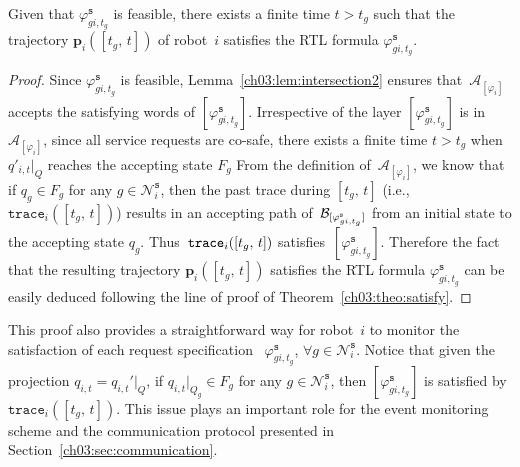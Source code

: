 \begin{theorem}\label{ch03:theo:service-done}
Given that $\varphi_{gi,t_g}^{\texttt{s}}$ is feasible,  there exists a finite time $t>t_g$ such  that the trajectory $\mathbf{p}_i([t_g,\,t])$ of robot~$i$ satisfies the RTL formula $\varphi_{gi,t_g}^{\texttt{s}}$.
\end{theorem}
\begin{proof}
  Since $\varphi_{gi,t_g}^{\texttt{s}}$ is feasible, Lemma~\ref{ch03:lem:intersection2} ensures that~$\mathcal{A}_{[\varphi_i]}$ accepts the satisfying words of $[\varphi_{gi,t_g}^{\texttt{s}}]$. Irrespective of the layer $[\varphi_{gi,t_g}^{\texttt{s}}]$ is in~$\mathcal{A}_{[\varphi_i]}$, since all service requests are co-safe, there exists a finite time $t>t_g$ when $q'_{i,t}|_{Q}$ reaches the accepting state $F_g$
From the definition of~$\mathcal{A}_{[\varphi_i]}$,
we know that if $q_g\in F_g$ for any $g\in \mathcal{N}_i^\texttt{s}$, then the past trace during $[t_g,\,t]$ (i.e., $\texttt{trace}_{i}([t_g,\, t])$) results in an accepting path of~$\mathcal{B}_{[\varphi_{gi,t_g}^{\textup{\texttt{s}}}]}$ from an initial state  to the accepting state $q_g$.
Thus~$\textup{\texttt{trace}}_{i}([t_g,\,t])$ satisfies~$[\varphi_{gi,t_g}^{\texttt{s}}]$.
Therefore the fact that the resulting trajectory $\mathbf{p}_i([t_g,\,t])$ satisfies the RTL formula $\varphi_{gi,t_g}^{\texttt{s}}$ can be easily deduced following the line of proof of Theorem~\ref{ch03:theo:satisfy}.
\end{proof}

This proof also provides a straightforward way for robot~$i$ to monitor the satisfaction of each request specification ~$\varphi_{gi,t_g}^{\texttt{s}}$, $\forall g\in \mathcal{N}_i^\texttt{s}$. Notice that given the projection $q_{i,t}=q_{i,t}'|_Q$, if $q_{i,t}|_{Q_g}\in F_g$ for any $g\in \mathcal{N}_i^\texttt{s}$, then $[\varphi_{gi,t_g}^{\texttt{s}}]$ is satisfied by $\texttt{trace}_{i}([t_g,\, t])$.
This issue plays an important role for the event monitoring scheme and the communication protocol presented in Section~\ref{ch03:sec:communication}.

%

